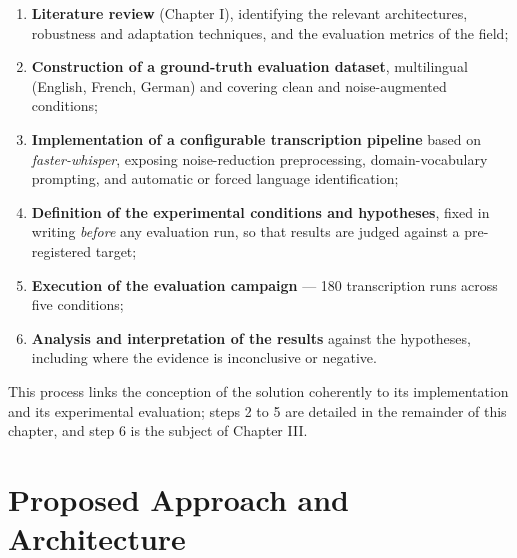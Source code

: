 \documentclass[12pt]{report}
\begin{document}
\begin{enumerate}
    \item \textbf{Literature review} (Chapter I), identifying the relevant architectures, robustness and adaptation techniques, and the evaluation metrics of the field;
    \item \textbf{Construction of a ground-truth evaluation dataset}, multilingual (English, French, German) and covering clean and noise-augmented conditions;
    \item \textbf{Implementation of a configurable transcription pipeline} based on \textit{faster-whisper}, exposing noise-reduction preprocessing, domain-vocabulary prompting, and automatic or forced language identification;
    \item \textbf{Definition of the experimental conditions and hypotheses}, fixed in writing \emph{before} any evaluation run, so that results are judged against a pre-registered target;
    \item \textbf{Execution of the evaluation campaign} --- 180 transcription runs across five conditions;
    \item \textbf{Analysis and interpretation of the results} against the hypotheses, including where the evidence is inconclusive or negative.
\end{enumerate}
This process links the conception of the solution coherently to its implementation and its experimental evaluation; steps 2 to 5 are detailed in the remainder of this chapter, and step 6 is the subject of Chapter III.
\section{Proposed Approach and Architecture}
\end{document}
